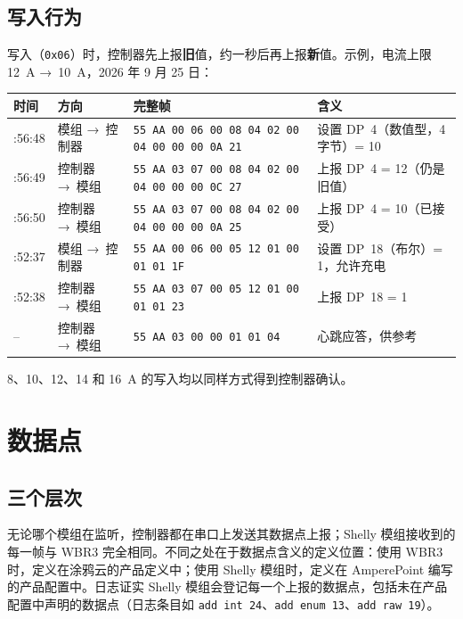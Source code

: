 \documentclass[11pt,a4paper]{article}
\newcommand{\ra}{{\symbolfont →}}
\newcommand{\hx}[1]{\texttt{#1}}
\begin{document}
\subsection{写入行为}

写入（\hx{0x06}）时，控制器先上报\textbf{旧}值，约一秒后再上报\textbf{新}值。示例，电流上限 12~A \ra\ 10~A，2026 年 9 月 25 日：

\begin{longtable}{>{\raggedright\arraybackslash}p{1.6cm}>{\raggedright\arraybackslash}p{2.5cm}>{\raggedright\arraybackslash}p{6.3cm}>{\raggedright\arraybackslash}p{5.4cm}}
\toprule
\rowcolor{aphead}\textbf{时间} & \textbf{方向} & \textbf{完整帧} & \textbf{含义} \\
\midrule\endhead
\bottomrule\endfoot
11:56:48 & 模组 \ra\ 控制器 & \hx{55 AA 00 06 00 08 04 02 00 04 00 00 00 0A 21} & 设置 DP~4（数值型，4 字节）= 10 \\
11:56:49 & 控制器 \ra\ 模组 & \hx{55 AA 03 07 00 08 04 02 00 04 00 00 00 0C 27} & 上报 DP~4 = 12（仍是旧值） \\
11:56:50 & 控制器 \ra\ 模组 & \hx{55 AA 03 07 00 08 04 02 00 04 00 00 00 0A 25} & 上报 DP~4 = 10（已接受） \\
10:52:37 & 模组 \ra\ 控制器 & \hx{55 AA 00 06 00 05 12 01 00 01 01 1F} & 设置 DP~18（布尔）= 1，允许充电 \\
10:52:38 & 控制器 \ra\ 模组 & \hx{55 AA 03 07 00 05 12 01 00 01 01 23} & 上报 DP~18 = 1 \\
-- & 控制器 \ra\ 模组 & \hx{55 AA 03 00 00 01 01 04} & 心跳应答，供参考 \\
\end{longtable}

8、10、12、14 和 16~A 的写入均以同样方式得到控制器确认。

\section{数据点}

\subsection{三个层次}

无论哪个模组在监听，控制器都在串口上发送其数据点上报；Shelly 模组接收到的每一帧与 WBR3 完全相同。不同之处在于数据点含义的定义位置：使用 WBR3 时，定义在涂鸦云的产品定义中；使用 Shelly 模组时，定义在 AmperePoint 编写的产品配置中。日志证实 Shelly 模组会登记每一个上报的数据点，包括未在产品配置中声明的数据点（日志条目如 \texttt{add int 24}、\texttt{add enum 13}、\texttt{add raw 19}）。
\end{document}
